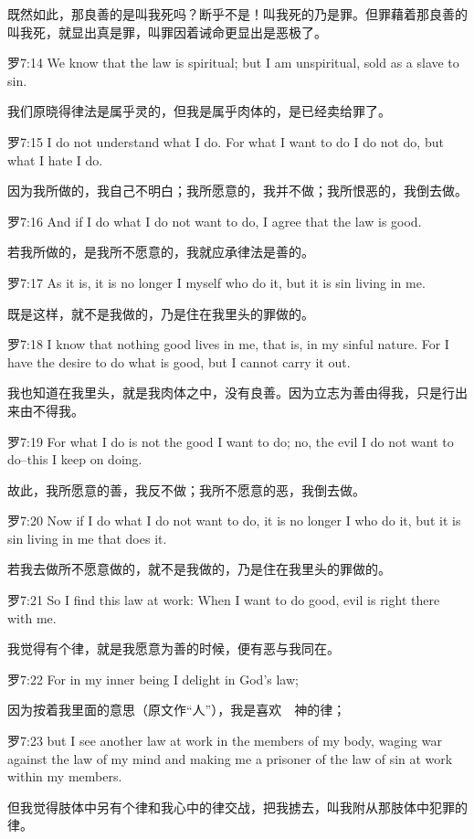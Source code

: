 \documentclass[a4paper,11pt,onecolumn,twoside]{ctexart}
\begin{document}
\begin{multicols}{2}
 既然如此，那良善的是叫我死吗？断乎不是！叫我死的乃是罪。但罪藉着那良善的叫我死，就显出真是罪，叫罪因着诫命更显出是恶极了。


 罗7:14
 We know that the law is spiritual; but I am unspiritual, sold as a slave to sin.

 我们原晓得律法是属乎灵的，但我是属乎肉体的，是已经卖给罪了。


 罗7:15
 I do not understand what I do. For what I want to do I do not do, but what I hate I do.

 因为我所做的，我自己不明白；我所愿意的，我并不做；我所恨恶的，我倒去做。


 罗7:16
 And if I do what I do not want to do, I agree that the law is good.

 若我所做的，是我所不愿意的，我就应承律法是善的。


 罗7:17
 As it is, it is no longer I myself who do it, but it is sin living in me.

 既是这样，就不是我做的，乃是住在我里头的罪做的。


 罗7:18
 I know that nothing good lives in me, that is, in my sinful nature. For I have the desire to do what is good, but I cannot carry it out.

 我也知道在我里头，就是我肉体之中，没有良善。因为立志为善由得我，只是行出来由不得我。


 罗7:19
 For what I do is not the good I want to do; no, the evil I do not want to do--this I keep on doing.

 故此，我所愿意的善，我反不做；我所不愿意的恶，我倒去做。


 罗7:20
 Now if I do what I do not want to do, it is no longer I who do it, but it is sin living in me that does it.

 若我去做所不愿意做的，就不是我做的，乃是住在我里头的罪做的。


 罗7:21
 So I find this law at work: When I want to do good, evil is right there with me.

 我觉得有个律，就是我愿意为善的时候，便有恶与我同在。


 罗7:22
 For in my inner being I delight in God's law;

 因为按着我里面的意思（原文作“人”），我是喜欢　神的律；


 罗7:23
 but I see another law at work in the members of my body, waging war against the law of my mind and making me a prisoner of the law of sin at work within my members.

 但我觉得肢体中另有个律和我心中的律交战，把我掳去，叫我附从那肢体中犯罪的律。



\end{multicols}
\end{document}
